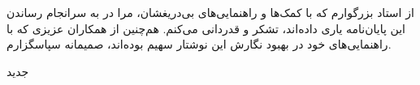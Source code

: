 


\begin{center}
\end{center}

از استاد بزرگوارم که با کمک‌ها و راهنمایی‌های بی‌دریغشان، مرا
در به سرانجام رساندن این پایان‌نامه یاری داده‌اند، تشکر و قدردانی می‌کنم.
هم‌چنین از همکاران عزیزی که با راهنمایی‌های خود در بهبود نگارش این نوشتار
سهیم بوده‌اند، صمیمانه سپاسگزارم.

‌جدید
